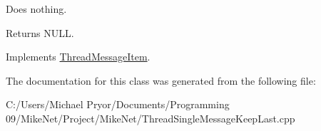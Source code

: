 Does nothing. 

\begin{DoxyReturn}{Returns}
NULL. 
\end{DoxyReturn}


Implements \hyperlink{class_thread_message_item_ae09a47834e313524b19700ebc92b0dfe}{ThreadMessageItem}.



The documentation for this class was generated from the following file:\begin{DoxyCompactItemize}
\item 
C:/Users/Michael Pryor/Documents/Programming 09/MikeNet/Project/MikeNet/ThreadSingleMessageKeepLast.cpp\end{DoxyCompactItemize}
